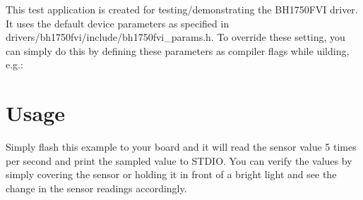 This test application is created for testing/demonstrating the B\+H1750\+F\+VI driver. It uses the default device parameters as specified in {\ttfamily drivers/bh1750fvi/include/bh1750fvi\+\_\+params.\+h}. To override these setting, you can simply do this by defining these parameters as compiler flags while uilding, e.\+g.\+: 


\section*{Usage}

Simply flash this example to your board and it will read the sensor value 5 times per second and print the sampled value to S\+T\+D\+IO. You can verify the values by simply covering the sensor or holding it in front of a bright light and see the change in the sensor readings accordingly. 